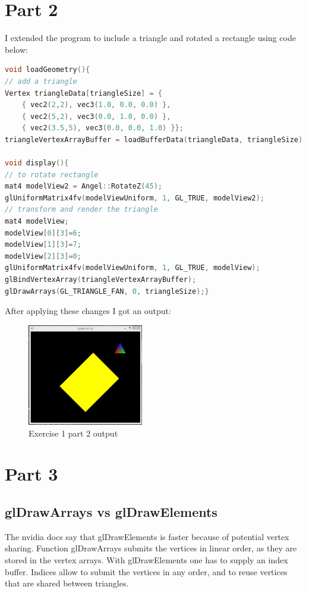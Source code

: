 \section{Part 2}
I extended the program to include a triangle and rotated a rectangle using code below:
\begin{lstlisting}[language=cpp, caption={Exercise 1 part 1 code changes}]
void loadGeometry(){
// add a triangle
Vertex triangleData[triangleSize] = {
	{ vec2(2,2), vec3(1.0, 0.0, 0.0) },
	{ vec2(5,2), vec3(0.0, 1.0, 0.0) },
	{ vec2(3.5,5), vec3(0.0, 0.0, 1.0) }};
triangleVertexArrayBuffer = loadBufferData(triangleData, triangleSize);}

void display(){
// to rotate rectangle
mat4 modelView2 = Angel::RotateZ(45);
glUniformMatrix4fv(modelViewUniform, 1, GL_TRUE, modelView2);
// transform and render the triangle
mat4 modelView;
modelView[0][3]=6;
modelView[1][3]=7;
modelView[2][3]=0;
glUniformMatrix4fv(modelViewUniform, 1, GL_TRUE, modelView);
glBindVertexArray(triangleVertexArrayBuffer);
glDrawArrays(GL_TRIANGLE_FAN, 0, triangleSize);}
\end{lstlisting}
After applying these changes I got an output: \\
\begin{figure}[ht!]
	\begin{center}
		\includegraphics[width=0.45\textwidth]{figures/exercise_1_part_2}
	\end{center}
	\caption{Exercise 1 part 2 output}
\end{figure}


\section{Part 3}
\subsection{glDrawArrays vs glDrawElements}
The nvidia docs say that glDrawElements is faster because of potential vertex sharing.
Function glDrawArrays submits the vertices in linear order, as they are stored in the vertex arrays.
With glDrawElements one has to supply an index buffer. Indices allow to submit the vertices in any 
order, and to reuse vertices that are shared between triangles.
